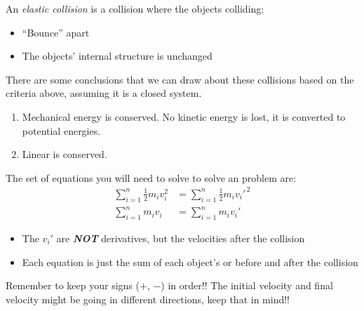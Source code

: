 \begin{definition}\label{def:Elastic Collision}
  An \emph{elastic collision} is a collision where the objects colliding:

  \begin{itemize}[noitemsep, nolistsep]
    \item ``Bounce'' apart
    \item The objects' internal structure is unchanged
  \end{itemize}

  There are some conclusions that we can draw about these collisions based on the criteria above, assuming it is a closed system.
  \begin{enumerate}
    \item Mechanical energy is conserved. No kinetic energy is lost, it is converted to potential energies.
    \item Linear  is conserved.
  \end{enumerate}

  The set of equations you will need to solve to solve an  problem are:
  \begin{equation}\label{eq:Elastic Collision}
    \begin{aligned}
      \sum\limits_{i=1}^{n} \frac{1}{2} m_{i}v_{i}^{2} &= \sum\limits_{i=1}^{n} \frac{1}{2} m_{i}v_{i}'^{\,2} \\
      \sum\limits_{i=1}^{n} m_{i}v_{i} &= \sum\limits_{i=1}^{n} m_{i}v_{i}'
    \end{aligned}
  \end{equation}

  \begin{itemize}[noitemsep, nolistsep]
    \item The $v_{i}'$ are \textbf{\emph{NOT}} derivatives, but the velocities after the collision
    \item Each equation is just the sum of each object's  or  before and after the collision
  \end{itemize}

  \begin{remark}
    Remember to keep your signs ($+$, $-$) in order!!
    The initial velocity and final velocity might be going in different directions, keep that in mind!!
  \end{remark}
\end{definition}

